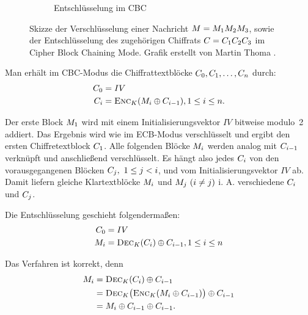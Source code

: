\begin{figure}[h]
\begin{subfigure}[h]{.45\textwidth}
		\caption{Entschlüsselung im CBC}
	\end{subfigure}
	\caption{Skizze der Verschlüsselung einer Nachricht $M = M_1 M_2 M_3$, sowie der Entschlüsselung des zugehörigen Chiffrats $C = C_1 C_2 C_3$ im
	Cipher Block Chaining Mode. Grafik erstellt von Martin Thoma \cite{Thoma2013}.}
	\label{pc:cbc}
\end{figure}

Man erhält im CBC-Modus die Chiffrattextblöcke $C_0, C_1, \ldots, C_n$ durch:
\begin{align*}
	C_0 &= IV\\
	C_i &= \textsc{Enc}_{K}(M_i \oplus C_{i-1}){,}\, 1 \leq i \leq n.
\end{align*}

Der erste Block $M_1$ wird mit einem Initialisierungsvektor $IV$ bitweise modulo~2 addiert. Das Ergebnis wird wie im ECB-Modus verschlüsselt und ergibt den ersten Chiffretextblock $C_1$.
Alle folgenden Blöcke $M_i$ werden analog mit $C_{i-1}$ verknüpft und anschließend verschlüsselt. 
Es hängt also jedes $C_i$ von den vorausgegangenen Blöcken $C_j,\ 1\leq j<i$, und vom Initialisierungsvektor $IV$ ab. Damit
liefern gleiche Klartextblöcke $M_i$ und $M_j\ (i\neq j)$ i. A. verschiedene $C_i$ und $C_j$.

Die Entschlüsselung geschieht folgendermaßen:
\begin{align*}
	C_0 &= IV\\
	M_i &= \textsc{Dec}_{K}(C_i)\oplus C_{i-1}{,}\, 1 \leq i \leq n
\end{align*}

Das Verfahren ist korrekt, denn
\begin{align*}
	\begin{split}
		M_i &= \textsc{Dec}_{K}(C_i)\oplus C_{i-1}\\
		&= \textsc{Dec}_{K} \bigl(\textsc{Enc}_{K}(M_i\oplus C_{i-1})\bigr) \oplus C_{i-1}\\
		&= M_i\oplus C_{i-1}\oplus C_{i-1}.
	\end{split}
\end{align*}


